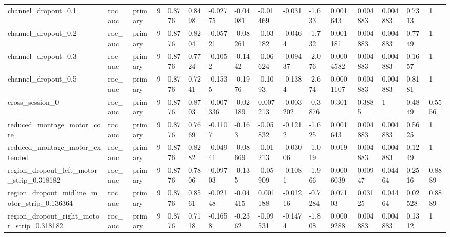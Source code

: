 \begin{tabular}{llllllllllllllll}
channel\_dropout\_0.1 & roc\_auc & primary & 9 & 0.8776 & 0.8498 & -0.02775 & -0.04081 & -0.01469 & -0.031 & -1.633 & 0.001643 & 0.004883 & 0.004883 & 0.7313 & 1 \\
channel\_dropout\_0.2 & roc\_auc & primary & 9 & 0.8776 & 0.8204 & -0.05721 & -0.08261 & -0.03182 & -0.0464 & -1.732 & 0.001181 & 0.004883 & 0.004883 & 0.7749 & 1 \\
channel\_dropout\_0.3 & roc\_auc & primary & 9 & 0.8776 & 0.7724 & -0.1052 & -0.1442 & -0.06624 & -0.09437 & -2.076 & 0.0004582 & 0.004883 & 0.004883 & 0.1657 & 1 \\
channel\_dropout\_0.5 & roc\_auc & primary & 9 & 0.8776 & 0.7241 & -0.1535 & -0.1976 & -0.1093 & -0.1384 & -2.674 & 0.0001107 & 0.004883 & 0.004883 & 0.8181 & 1 \\
cross\_session\_0 & roc\_auc & primary & 9 & 0.8776 & 0.8703 & -0.007336 & -0.02189 & 0.007213 & -0.003202 & -0.3876 & 0.301 & 0.3885 & 1 & 0.4849 & 0.5556 \\
reduced\_montage\_motor\_core & roc\_auc & primary & 9 & 0.8776 & 0.7669 & -0.1107 & -0.163 & -0.05832 & -0.1212 & -1.625 & 0.001643 & 0.004883 & 0.004883 & 0.5625 & 1 \\
reduced\_montage\_motor\_extended & roc\_auc & primary & 9 & 0.8776 & 0.8282 & -0.04941 & -0.08669 & -0.01213 & -0.03006 & -1.019 & 0.019 & 0.004883 & 0.004883 & 0.1249 & 1 \\
region\_dropout\_left\_motor\_strip\_0.318182 & roc\_auc & primary & 9 & 0.8776 & 0.7806 & -0.09703 & -0.135 & -0.05909 & -0.1081 & -1.966 & 0.0006039 & 0.00947 & 0.04464 & 0.2516 & 0.8889 \\
region\_dropout\_midline\_motor\_strip\_0.136364 & roc\_auc & primary & 9 & 0.8776 & 0.8561 & -0.02148 & -0.04415 & 0.001188 & -0.01216 & -0.7284 & 0.07103 & 0.03125 & 0.04464 & 0.02528 & 0.8889 \\
region\_dropout\_right\_motor\_strip\_0.318182 & roc\_auc & primary & 9 & 0.8776 & 0.7118 & -0.1658 & -0.2362 & -0.09531 & -0.1474 & -1.808 & 0.0009288 & 0.004883 & 0.004883 & 0.1312 & 1 \\
\bottomrule
\end{tabular}
